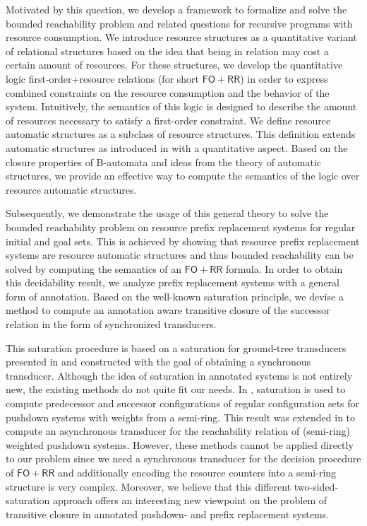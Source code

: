 \documentclass{LMCS}
\newcommand{\FORR}{\ensuremath{\mathsf{FO\!\!+\!\!RR}}}
\begin{document}
Motivated by this question, we develop a framework to formalize and
solve the bounded reachability problem and related questions for recursive
programs with resource consumption. We introduce resource structures as
a quantitative variant of relational structures based on the idea that being in
relation may cost a certain amount of resources. For these structures, we
develop the quantitative logic first-order+resource relations (for short
\FORR{}) in order to express combined constraints on the resource
consumption and the behavior of the system. Intuitively, the semantics of this
logic is designed to describe the amount of resources necessary to satisfy a
first-order constraint. We define resource automatic structures as a subclass of
resource structures. This definition extends automatic structures as introduced
in \cite{automatic-structures} with a quantitative aspect. Based on the closure
properties of B-automata and ideas from the theory of automatic structures, we
provide an effective way to compute the semantics of the logic over resource
automatic structures.

Subsequently, we demonstrate the usage of this general theory to
solve the bounded reachability problem on resource prefix replacement systems
for regular initial and goal sets. This is achieved by showing that resource
prefix replacement systems are resource automatic structures and thus bounded
reachability can be solved by computing the semantics of an \FORR{} formula. In
order to obtain this decidability result, we analyze prefix replacement systems with a
general form of annotation. Based on the well-known saturation principle, we
devise a method to compute an annotation aware transitive closure of the
successor relation in the form of synchronized transducers. 

This saturation procedure is based on a saturation for ground-tree
transducers presented in \cite{gtt-saturation} and constructed with
the goal of obtaining a synchronous transducer. Although the idea of saturation
in annotated systems is not entirely new, the existing methods do not quite fit
our needs. In \cite{RepsSchwoon-WeightedPushdown}, saturation is used to compute
predecessor and successor configurations of regular configuration sets for
pushdown systems with weights from a semi-ring. This result
was extended in \cite{Lal-TACAS08} to compute an asynchronous transducer for
the reachability relation of (semi-ring) weighted pushdown systems. However,
these methods cannot be applied directly to our problem since we need a 
synchronous transducer for the decision procedure of \FORR{} and additionally
encoding the resource counters into a semi-ring structure is very complex. 
Moreover, we believe that this different two-sided-saturation approach
offers an interesting new viewpoint  on the problem of transitive closure in
annotated pushdown- and prefix replacement systems.
\end{document}
